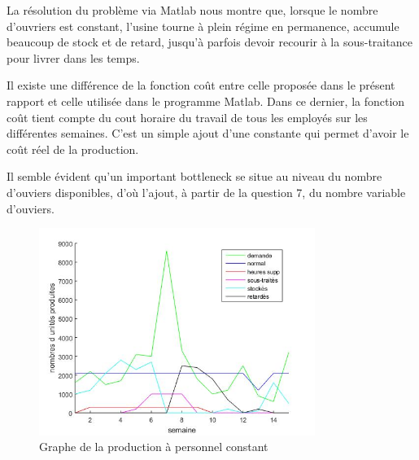 La résolution du problème via Matlab nous montre que, lorsque le nombre d'ouvriers est constant, l'usine tourne à plein régime en permanence, accumule beaucoup de stock et de retard, jusqu'à parfois devoir recourir à la sous-traitance pour livrer dans les temps.

Il existe une différence de la fonction coût entre celle proposée dans le présent rapport et celle utilisée dans le programme Matlab. Dans ce dernier, la fonction coût tient compte du cout horaire du travail de tous les employés sur les différentes semaines. C'est un simple ajout d'une constante qui permet d'avoir le coût réel de la production.

Il semble évident qu'un important bottleneck se situe au niveau du nombre d'ouviers disponibles, d'où l'ajout, à partir de la question 7, du nombre variable d'ouviers.

\begin{figure}[h]
    \centering
    \includegraphics[width=0.8\textwidth]{graphes/graphq3.jpg}
    \caption{Graphe de la production à personnel constant}
    \label{fig:q3}
\end{figure}

